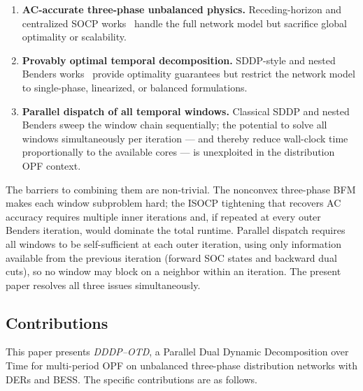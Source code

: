 \begin{enumerate}
  \item \textbf{AC-accurate three-phase unbalanced physics.} Receding-horizon
        and centralized SOCP works~\cite{NaRa20,AvCa20} handle the full network
        model but sacrifice global optimality or scalability.
  \item \textbf{Provably optimal temporal decomposition.} SDDP-style and nested
        Benders works~\cite{LaZh22,GiSu21,AgPi21} provide optimality guarantees
        but restrict the network model to single-phase, linearized, or balanced
        formulations.
  \item \textbf{Parallel dispatch of all temporal windows.} Classical SDDP and
        nested Benders sweep the window chain sequentially; the potential to
        solve all windows simultaneously per iteration — and thereby reduce
        wall-clock time proportionally to the available cores — is unexploited
        in the distribution OPF context.
\end{enumerate}

\noindent The barriers to combining them are non-trivial. The nonconvex
three-phase BFM makes each window subproblem hard; the ISOCP tightening that
recovers AC accuracy requires multiple inner iterations and, if repeated at every
outer Benders iteration, would dominate the total runtime. Parallel dispatch
requires all windows to be self-sufficient at each outer iteration, using only
information available from the previous iteration (forward SOC states and
backward dual cuts), so no window may block on a neighbor within an iteration.
The present paper resolves all three issues simultaneously.

\subsection*{Contributions}

This paper presents \emph{DDDP--OTD}, a Parallel Dual Dynamic Decomposition
over Time for multi-period OPF on unbalanced three-phase distribution networks
with DERs and BESS. The specific contributions are as follows.

